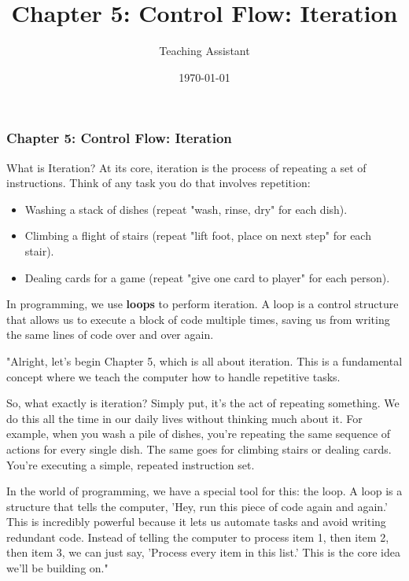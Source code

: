 \documentclass{beamer}
\title{Chapter 5: Control Flow: Iteration}
\author{Teaching Assistant}
\institute{Your Institution}
\date{\today}
\begin{document}
\frame{\titlepage}

\begin{frame}[fragile]
    \frametitle{Chapter 5: Control Flow: Iteration}
    
    \begin{block}{What is Iteration?}
        At its core, iteration is the process of repeating a set of instructions. Think of any task you do that involves repetition:
        \begin{itemize}
            \item Washing a stack of dishes (repeat "wash, rinse, dry" for each dish).
            \item Climbing a flight of stairs (repeat "lift foot, place on next step" for each stair).
            \item Dealing cards for a game (repeat "give one card to player" for each person).
        \end{itemize}
        
        \vspace{1em}
        
        In programming, we use \textbf{loops} to perform iteration. A loop is a control structure that allows us to execute a block of code multiple times, saving us from writing the same lines of code over and over again.
    \end{block}
    \begin{note}
    "Alright, let's begin Chapter 5, which is all about iteration. This is a fundamental concept where we teach the computer how to handle repetitive tasks.

    So, what exactly is iteration? Simply put, it's the act of repeating something. We do this all the time in our daily lives without thinking much about it. For example, when you wash a pile of dishes, you're repeating the same sequence of actions for every single dish. The same goes for climbing stairs or dealing cards. You're executing a simple, repeated instruction set.

    In the world of programming, we have a special tool for this: the loop. A loop is a structure that tells the computer, 'Hey, run this piece of code again and again.' This is incredibly powerful because it lets us automate tasks and avoid writing redundant code. Instead of telling the computer to process item 1, then item 2, then item 3, we can just say, 'Process every item in this list.' This is the core idea we'll be building on."
    \end{note}
\end{frame}
\end{document}
